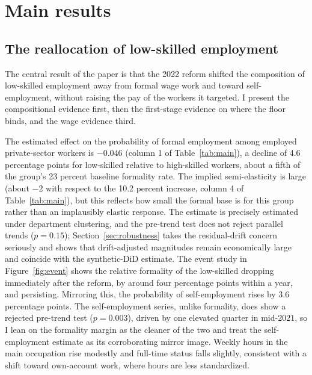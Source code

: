 \section{Main results}\label{sec:results}

\subsection{The reallocation of low-skilled employment}

The central result of the paper is that the 2022 reform shifted the composition of low-skilled employment away from formal wage work and toward self-employment, without raising the pay of the workers it targeted. I present the compositional evidence first, then the first-stage evidence on where the floor binds, and the wage evidence third.

The estimated effect on the probability of formal employment among employed private-sector workers is $-0.046$ (column 1 of Table~\ref{tab:main}), a decline of 4.6 percentage points for low-skilled relative to high-skilled workers, about a fifth of the group's 23 percent baseline formality rate. The implied semi-elasticity is large (about $-2$ with respect to the 10.2 percent increase, column 4 of Table~\ref{tab:main}), but this reflects how small the formal base is for this group rather than an implausibly elastic response. The estimate is precisely estimated under department clustering, and the pre-trend test does not reject parallel trends ($p=0.15$); Section~\ref{sec:robustness} takes the residual-drift concern seriously and shows that drift-adjusted magnitudes remain economically large and coincide with the synthetic-DiD estimate. The event study in Figure~\ref{fig:event} shows the relative formality of the low-skilled dropping immediately after the reform, by around four percentage points within a year, and persisting. Mirroring this, the probability of self-employment rises by 3.6 percentage points. The self-employment series, unlike formality, does show a rejected pre-trend test ($p=0.003$), driven by one elevated quarter in mid-2021, so I lean on the formality margin as the cleaner of the two and treat the self-employment estimate as its corroborating mirror image. Weekly hours in the main occupation rise modestly and full-time status falls slightly, consistent with a shift toward own-account work, where hours are less standardized.


